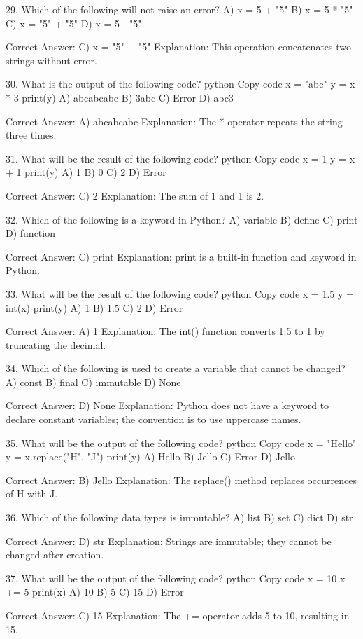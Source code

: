 29. Which of the following will not raise an error?
A) x = 5 + "5"
B) x = 5 * "5"
C) x = "5" + "5"
D) x = 5 - "5"

Correct Answer: C) x = "5" + "5"
Explanation: This operation concatenates two strings without error.

30. What is the output of the following code?
python
Copy code
x = "abc"
y = x * 3
print(y)
A) abcabcabc
B) 3abc
C) Error
D) abc3

Correct Answer: A) abcabcabc
Explanation: The * operator repeats the string three times.

31. What will be the result of the following code?
python
Copy code
x = 1
y = x + 1
print(y)
A) 1
B) 0
C) 2
D) Error

Correct Answer: C) 2
Explanation: The sum of 1 and 1 is 2.

32. Which of the following is a keyword in Python?
A) variable
B) define
C) print
D) function

Correct Answer: C) print
Explanation: print is a built-in function and keyword in Python.

33. What will be the result of the following code?
python
Copy code
x = 1.5
y = int(x)
print(y)
A) 1
B) 1.5
C) 2
D) Error

Correct Answer: A) 1
Explanation: The int() function converts 1.5 to 1 by truncating the decimal.

34. Which of the following is used to create a variable that cannot be changed?
A) const
B) final
C) immutable
D) None

Correct Answer: D) None
Explanation: Python does not have a keyword to declare constant variables; the convention is to use uppercase names.

35. What will be the output of the following code?
python
Copy code
x = "Hello"
y = x.replace("H", "J")
print(y)
A) Hello
B) Jello
C) Error
D) Jello

Correct Answer: B) Jello
Explanation: The replace() method replaces occurrences of H with J.

36. Which of the following data types is immutable?
A) list
B) set
C) dict
D) str

Correct Answer: D) str
Explanation: Strings are immutable; they cannot be changed after creation.

37. What will be the output of the following code?
python
Copy code
x = 10
x += 5
print(x)
A) 10
B) 5
C) 15
D) Error

Correct Answer: C) 15
Explanation: The += operator adds 5 to 10, resulting in 15.

